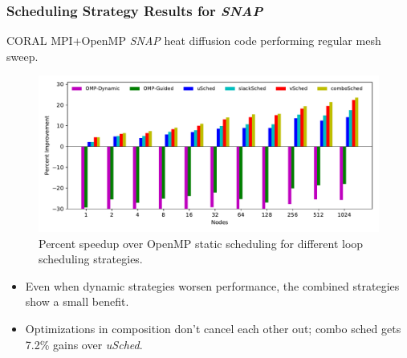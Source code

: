 \begin{frame}[label=combinedregmesh]
\frametitle{Scheduling Strategy Results for \textit{SNAP}}
{\tiny CORAL MPI+OpenMP \textit{SNAP} heat diffusion code performing regular mesh sweep.}
\begin{figure}[ht!]
\includegraphics[scale=0.38]{./plots/app-scaling-strat-SNAP-fastNUMA2}
\caption{\tiny Percent speedup over OpenMP static scheduling for
  different loop scheduling strategies.}
\end{figure}
\begin{itemize}
  \small \item \small Even when dynamic strategies worsen performance, the combined strategies show a small benefit.
\item \small Optimizations in composition don't cancel each other out; combo sched gets 7.2\% gains over \textit{uSched}.
\end{itemize}
\end{frame}


